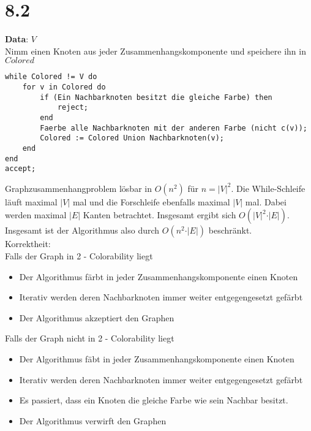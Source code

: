 \documentclass{article}
\begin{document}
\section{8.2}

\textbf{Data}: $V$\\
Nimm einen Knoten aus jeder Zusammenhangskomponente und speichere ihn in $Colored$\\
\begin{lstlisting}
while Colored != V do
	for v in Colored do
		if (Ein Nachbarknoten besitzt die gleiche Farbe) then
			reject; 
		end
		Faerbe alle Nachbarknoten mit der anderen Farbe (nicht c(v));
		Colored := Colored Union Nachbarknoten(v);  
	end	
end		
accept;		
\end{lstlisting}

Graphzusammenhangproblem lösbar in $O(n^2)$ für $n = \vert V \vert^2$. Die While-Schleife läuft maximal $\vert V\vert$ mal und die Forschleife ebenfalls maximal $\vert V\vert$ mal. Dabei werden maximal $\vert E\vert$ Kanten betrachtet. Insgesamt ergibt sich $O(\vert V\vert^2 \cdot \vert E\vert)$. Insgesamt ist der Algorithmus also durch $O(n^2 \cdot \vert E\vert)$ beschränkt.\\

Korrektheit:\\
Falls der Graph in 2 - Colorability liegt
\begin{itemize}
\item Der Algorithmus färbt in jeder Zusammenhangskomponente einen Knoten
\item Iterativ werden deren Nachbarknoten immer weiter entgegengesetzt gefärbt
\item Der Algorithmus akzeptiert den Graphen
\end{itemize}	
Falls der Graph nicht in 2 - Colorability liegt
\begin{itemize}
\item Der Algorithmus fäbt in jeder Zusammenhangskomponente einen Knoten
\item Iterativ werden deren Nachbarknoten immer weiter entgegengesetzt gefärbt
\item Es passiert, dass ein Knoten die gleiche Farbe wie sein Nachbar besitzt. 
\item Der Algorithmus verwirft den Graphen
\end{itemize}
\end{document}
